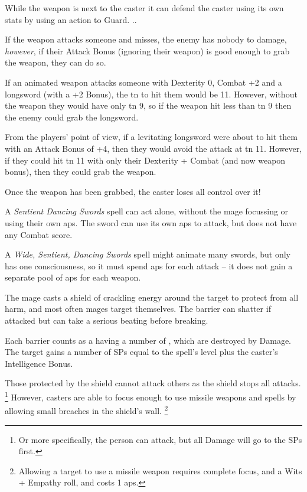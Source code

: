 \begin{multicols}{2}
{While the weapon is next to the caster it can defend the caster using its own stats by using an action to Guard.
}{.}.

If the weapon attacks someone and misses, the enemy has nobody to damage, \emph{however}, if their Attack Bonus (ignoring their weapon) is good enough to grab the weapon, they can do so.

\begin{exampletext}

  If an animated weapon attacks someone with Dexterity 0, Combat +2 and a longsword (with a +2 Bonus), the \gls{tn} to hit them would be 11.
  However, without the weapon they would have only \gls{tn} 9, so if the weapon hit less than \gls{tn} 9 then the enemy could grab the longsword.

  From the players' point of view, if a levitating longsword were about to hit them with an Attack Bonus of +4, then they would avoid the attack at \gls{tn} 11.
  However, if they could hit \gls{tn} 11 with only their Dexterity + Combat (and now weapon bonus), then they could grab the weapon.

\end{exampletext}

Once the weapon has been grabbed, the caster loses all control over it!

A \textit{Sentient Dancing Swords} spell can act alone, without the mage focussing or using their own \glspl{ap}.
The sword can use its own \glspl{ap} to attack, but does not have any Combat score.

A \textit{Wide, Sentient, Dancing Swords} spell might animate many swords, but only has one consciousness, so it must spend \glspl{ap} for each attack -- it does not gain a separate pool of \glspl{ap} for each weapon.


The mage casts a shield of crackling energy around the target to protect from all harm, and most often mages target themselves.
The barrier can shatter if attacked but can take a serious beating before breaking.

Each barrier counts as a having a number of , which are destroyed by Damage.
The target gains a number of \glspl{SP} equal to the spell's level plus the caster's Intelligence Bonus.

Those protected by the shield cannot attack others as the shield stops all attacks.%
\footnote{Or more specifically, the person can attack, but all Damage will go to the \glspl{SP} first.}
However, casters are able to focus enough to use missile weapons and spells by allowing small breaches in the shield's wall.
\footnote{Allowing a target to use a missile weapon requires complete focus, and a Wits + Empathy roll, and costs 1 \glspl{ap}.}


\end{multicols}
